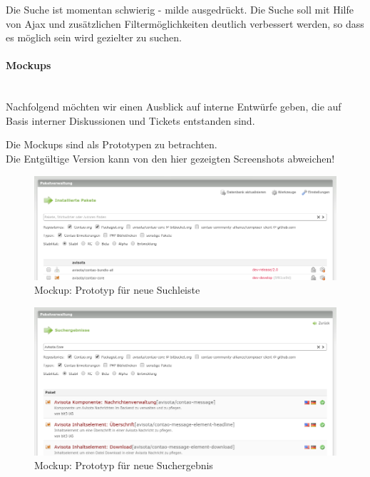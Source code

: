 \documentclass[
paper=a4,
draft=false,%
fontsize=10pt%
]{scrartcl}
\begin{document}
Die Suche ist momentan schwierig - milde ausgedrückt. Die Suche soll mit Hilfe von Ajax und zusätzlichen Filtermöglichkeiten deutlich verbessert werden, so dass es möglich sein wird gezielter zu suchen.

\paragraph{Mockups} ~\\
Nachfolgend möchten wir einen Ausblick auf interne Entwürfe geben, die auf Basis interner Diskussionen und Tickets entstanden sind.

\begin{danger}
Die Mockups sind als Prototypen zu betrachten. \\
Die Entgültige Version kann von den hier gezeigten Screenshots abweichen!
\end{danger}

\begin{figure}[p]
  \centering
  \includegraphics[width=\textwidth]{bilder/mockup-search-bar}
  \caption{Mockup: Prototyp für neue Suchleiste}
\end{figure}

\begin{figure}[p]
  \centering
  \includegraphics[width=\textwidth]{bilder/mockup-search-result}
  \caption{Mockup: Prototyp für neue Suchergebnis}
\end{figure}
\end{document}
